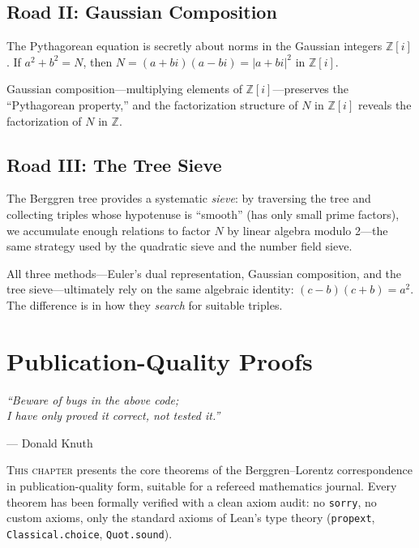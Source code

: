\documentclass[11pt,twoside,openright]{book}
\theoremstyle{definition}
\newcommand{\Z}{\mathbb{Z}}
\newcommand{\sorry}{\texttt{sorry}}
\begin{document}
\section{Road II: Gaussian Composition}

The Pythagorean equation is secretly about norms in the Gaussian integers
$\Z[i]$. If $a^2 + b^2 = N$, then $N = (a+bi)(a-bi) = |a+bi|^2$ in $\Z[i]$.

Gaussian composition---multiplying elements of $\Z[i]$---preserves the
``Pythagorean property,'' and the factorization structure of $N$ in $\Z[i]$
reveals the factorization of $N$ in $\Z$.

\section{Road III: The Tree Sieve}

The Berggren tree provides a systematic \emph{sieve}: by traversing the
tree and collecting triples whose hypotenuse is ``smooth'' (has only small
prime factors), we accumulate enough relations to factor $N$ by
linear algebra modulo 2---the same strategy used by the quadratic sieve
and the number field sieve.

\begin{insightbox}
All three methods---Euler's dual representation, Gaussian composition,
and the tree sieve---ultimately rely on the same algebraic identity:
$(c-b)(c+b) = a^2$. The difference is in how they \emph{search} for
suitable triples.
\end{insightbox}

\chapter{Publication-Quality Proofs}
\label{ch:paper-proofs}

\epigraph{\itshape ``Beware of bugs in the above code;\\
I have only proved it correct, not tested it.''}
{--- Donald Knuth}

\lettrine[lines=3]{T}{his chapter} presents the core theorems of the
Berggren--Lorentz correspondence in publication-quality form, suitable
for a refereed mathematics journal. Every theorem has been formally
verified with a clean axiom audit: no \sorry{}, no custom axioms,
only the standard axioms of Lean's type theory (\texttt{propext},
\texttt{Classical.choice}, \texttt{Quot.sound}).
\end{document}
